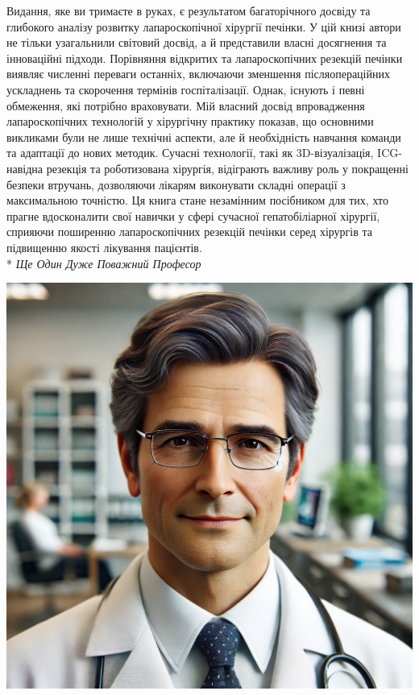 \newpage

\noindent
\begin{minipage}{0.65\textwidth}
Видання, яке ви тримаєте в руках, є результатом багаторічного досвіду та глибокого аналізу розвитку лапароскопічної хірургії печінки. У цій книзі автори не тільки узагальнили світовий досвід, а й представили власні досягнення та інноваційні підходи. Порівняння відкритих та лапароскопічних резекцій печінки виявляє численні переваги останніх, включаючи зменшення післяопераційних ускладнень та скорочення термінів госпіталізації. Однак, існують і певні обмеження, які потрібно враховувати. Мій власний досвід впровадження лапароскопічних технологій у хірургічну практику показав, що основними викликами були не лише технічні аспекти, але й необхідність навчання команди та адаптації до нових методик. Сучасні технології, такі як 3D-візуалізація, ICG-навідна резекція та роботизована хірургія, відіграють важливу роль у покращенні безпеки втручань, дозволяючи лікарям виконувати складні операції з максимальною точністю. Ця книга стане незамінним посібником для тих, хто прагне вдосконалити свої навички у сфері сучасної гепатобіліарної хірургії, сприяючи поширенню лапароскопічних резекцій печінки серед хірургів та підвищенню якості лікування пацієнтів.  
\\*
\vspace{30pt} 
\vfill 
\hfill \textit{Ще Один Дуже Поважний Професор}
\vfill 
\end{minipage}
\hfill
\begin{minipage}{0.3\textwidth}
    \centering
    \includegraphics[width=\textwidth]{Illustrations/Preface/image2.png}
\end{minipage}

